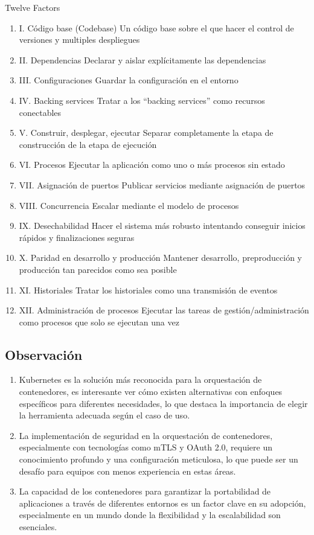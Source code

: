 \documentclass[12pt]{article}
\begin{document}
Twelve Factors
\begin{enumerate} 
\item I. Código base (Codebase)
Un código base sobre el que hacer el control de versiones y multiples despliegues
\item II. Dependencias
Declarar y aislar explícitamente las dependencias
\item III. Configuraciones
Guardar la configuración en el entorno
\item IV. Backing services
Tratar a los “backing services” como recursos conectables
\item V. Construir, desplegar, ejecutar
Separar completamente la etapa de construcción de la etapa de ejecución
\item VI. Procesos
Ejecutar la aplicación como uno o más procesos sin estado
\item VII. Asignación de puertos
Publicar servicios mediante asignación de puertos
\item VIII. Concurrencia
Escalar mediante el modelo de procesos
\item IX. Desechabilidad
Hacer el sistema más robusto intentando conseguir inicios rápidos y finalizaciones seguras
\item X. Paridad en desarrollo y producción
Mantener desarrollo, preproducción y producción tan parecidos como sea posible
\item XI. Historiales
Tratar los historiales como una transmisión de eventos
\item XII. Administración de procesos
Ejecutar las tareas de gestión/administración como procesos que solo se ejecutan una vez
\end{enumerate}
\cite{12Factor}

\subsection*{Observación}
\begin{enumerate}
    \item Kubernetes es la solución más reconocida para la orquestación de contenedores, es interesante ver cómo existen alternativas con enfoques específicos para diferentes necesidades, lo que destaca la importancia de elegir la herramienta adecuada según el caso de uso.
    \item La implementación de seguridad en la orquestación de contenedores, especialmente con tecnologías como mTLS y OAuth 2.0, requiere un conocimiento profundo y una configuración meticulosa, lo que puede ser un desafío para equipos con menos experiencia en estas áreas.
    \item La capacidad de los contenedores para garantizar la portabilidad de aplicaciones a través de diferentes entornos es un factor clave en su adopción, especialmente en un mundo donde la flexibilidad y la escalabilidad son esenciales.
\end{enumerate}
\end{document}
